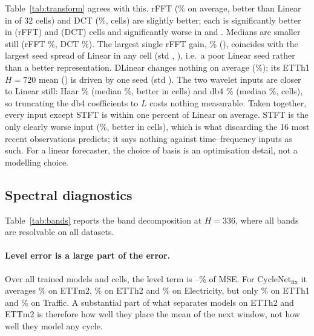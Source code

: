 \documentclass[11pt,a4paper]{article}
\begin{document}
Table~\ref{tab:transform} agrees with this. rFFT (\vTrRfftMean\% on average, better than Linear in \vTrRfftWins{} of 32 cells) and DCT (\vTrDctMean\%, \vTrDctWins{} cells) are slightly better; each is significantly better in \vTrRfftSigBetter{} (rFFT) and \vTrDctSigBetter{} (DCT) cells and significantly worse in \vTrRfftSigWorse{} and \vTrDctSigWorse. Medians are smaller still (rFFT \vTrRfftMedian\%, DCT \vTrDctMedian\%). The largest single rFFT gain, \vTrRfftBestGain\% (\vTrRfftBestCell), coincides with the largest seed spread of Linear in any cell (std \vLinOutlierStd, \vLinOutlierCell), i.e.\ a poor Linear seed rather than a better representation. DLinear changes nothing on average (\vTrDlinMean\%); its ETTh1 $H=720$ mean (\vDlinETThOneSevenTwenty) is driven by one seed (std \vDlinETThOneSevenTwentyStd). The two wavelet inputs are closer to Linear still: Haar \vTrHaarMean\% (median \vTrHaarMedian\%, better in \vTrHaarWins{} cells) and db4 \vTrDbfourMean\% (median \vTrDbfourMedian\%, \vTrDbfourWins{} cells), so truncating the db4 coefficients to $L$ costs nothing measurable. Taken together, every input except STFT is within one percent of Linear on average. STFT is the only clearly worse input (\vTrStftMean\%, better in \vTrStftWins{} cells), which is what discarding the 16 most recent observations predicts; it says nothing against time--frequency inputs as such. For a linear forecaster, the choice of basis is an optimisation detail, not a modelling choice.

\subsection{Spectral diagnostics}
\label{sec:res-bands}
Table~\ref{tab:bands} reports the band decomposition at $H=336$, where all bands are resolvable on all datasets.

\begin{table}[t]
\centering
\scriptsize
\setlength{\tabcolsep}{4pt}

\caption{\textbf{Band diagnostics at $H=336$} (mean over seeds). Share of MSE in each component; $FVU_b$ ($<1$: captures structure; $\approx1$: predicts nothing, correct for unpredictable content; $>1$: adds wrong content); energy ratio $\rho_b$ ($<1$: smoother than the truth).}
\label{tab:bands}
\end{table}

\paragraph{Level error is a large part of the error.}
Over all trained models and cells, the level term is \vLevelShareMin--\vLevelShareMax\% of MSE. For CycleNet$_{\text{fix}}$ it averages \vLevelShareETTmTwo\% on ETTm2, \vLevelShareETThTwo\% on ETTh2 and \vLevelShareElectricity\% on Electricity, but only \vLevelShareETThOne\% on ETTh1 and \vLevelShareTraffic\% on Traffic. A substantial part of what separates models on ETTh2 and ETTm2 is therefore how well they place the mean of the next window, not how well they model any cycle.
\end{document}
